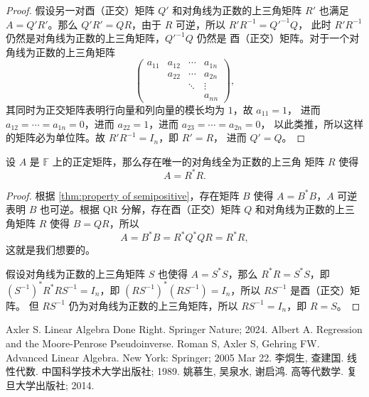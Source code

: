\documentclass[fontset=none,zihao=-4]{Notes}
\begin{document}
\begin{proof}
  假设另一对酉（正交）矩阵 $Q'$ 和对角线为正数的上三角矩阵 $R'$ 也满足
  $A=Q'R'$。那么 $Q'R'=QR$，由于 $R$ 可逆，所以 $R'R^{-1}=Q'^{-1}Q$，
  此时 $R'R^{-1}$ 仍然是对角线为正数的上三角矩阵，$Q'^{-1}Q$ 仍然是
  酉（正交）矩阵。对于一个对角线为正数的上三角矩阵
  \[
    \begin{pmatrix}
      a_{11} & a_{12} & \cdots & a_{1n} \\
      & a_{22} & \cdots & a_{2n} \\
      & & \ddots & \vdots \\
      & & & a_{nn}
    \end{pmatrix} , 
  \]
  其同时为正交矩阵表明行向量和列向量的模长均为 $1$，故 $a_{11}=1$，
  进而 $a_{12}=\cdots=a_{1n}=0$，进而 $a_{22}=1$，进而 $a_{23}=\cdots=a_{2n}=0$，
  以此类推，所以这样的矩阵必为单位阵。故 $R'R^{-1}=I_n$，即 $R'=R$，
  进而 $Q'=Q$。
\end{proof}

\begin{theorem}[Cholesky 分解]
  设 $A$ 是 $\mathbb{F}$ 上的正定矩阵，那么存在唯一的对角线全为正数的上三角
  矩阵 $R$ 使得
  \[
    A=R^*R.  
  \]
\end{theorem}
\begin{proof}
  根据 \autoref{thm:property of semipositive}，存在矩阵 $B$ 使得
  $A=B^*B$，$A$ 可逆表明 $B$ 也可逆。根据 QR 分解，存在酉（正交）矩阵
  $Q$ 和对角线为正数的上三角矩阵 $R$ 使得 $B=QR$，所以
  \[
    A=B^*B=R^*Q^*QR=R^*R,  
  \]
  这就是我们想要的。

  假设对角线为正数的上三角矩阵
  $S$ 也使得 $A=S^*S$，那么 $R^*R=S^*S$，即 $(S^{-1})^*R^*RS^{-1}=I_n$，即
  $(RS^{-1})^*(RS^{-1})=I_n$，所以 $RS^{-1}$ 是酉（正交）矩阵。
  但 $RS^{-1}$ 仍为对角线为正数的上三角矩阵，所以 $RS^{-1}=I_n$，即 $R=S$。
\end{proof}


\begin{thebibliography}{99}
    Axler S. Linear Algebra Done Right. Springer Nature; 2024.
   Albert A. Regression and the Moore-Penrose Pseudoinverse.
   Roman S, Axler S, Gehring FW. Advanced Linear Algebra. New York: Springer; 2005 Mar 22.
   李烔生, 查建国. 线性代数. 中国科学技术大学出版社; 1989.
   姚慕生, 吴泉水, 谢启鸿. 高等代数学. 复旦大学出版社; 2014.
\end{thebibliography}
\end{document}
